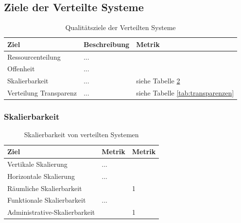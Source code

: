 \clearpage
\subsection{Ziele der Verteilte Systeme}
    \begin{table}[h!]
        \centering
        \begin{tabular}{p{4cm}|p{5cm}|p{5cm}|}
            \hline
            \textbf{Ziel} & \textbf{Beschreibung} & \textbf{Metrik} \\
            \hline
            Ressourcenteilung  & ...& \\
            Offenheit & ...& \\
            Skalierbarkeit & ...& siehe Tabelle \ref{tab:skalierbarkeit} \\
            Verteilung Transparenz & ...& siehe Tabelle \ref{tab:transparenzen} \\
            \hline
        \end{tabular}
        \caption{Qualitätsziele der Verteilten Systeme}
        \label{tab:vsziele}
    \end{table}
    
\subsubsection{Skalierbarkeit}
    \begin{table}[h!]
            \centering
            \begin{tabular}{p{4cm}|p{5cm}|p{5cm}|}
                \hline
                \textbf{Ziel} & \textbf{Metrik} & \textbf{Metrik} \\
                \hline
                Vertikale Skalierung   & ... &\\
                \hline
                Horizontale Skalierung & ...& \\
                \hline
                Räumliche Skalierbarkeit &  & 1 \\
                \hline
                Funktionale Skalierbarkeit & ... & \\
                \hline
                Administrative-Skalierbarkeit & &1 \\
                \hline
            \end{tabular}
            \caption{Skalierbarkeit von verteilten Systemen}
            \label{tab:skalierbarkeit}
        \end{table}
    
\newpage

